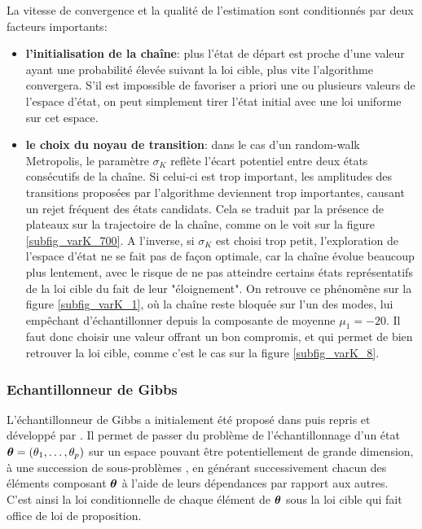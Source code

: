 La vitesse de convergence et la qualité de l'estimation sont conditionnés par deux facteurs importants: 
\begin{itemize}
	\item \textbf{l'initialisation de la chaîne}: plus l'état de départ est proche d'une valeur ayant une probabilité élevée suivant la loi cible, plus vite l'algorithme convergera. S'il est impossible de favoriser a priori une ou plusieurs valeurs de l'espace d'état, on peut simplement tirer l'état initial avec une loi uniforme sur cet espace.
	\item \textbf{le choix du noyau de transition}: dans le cas d'un random-walk Metropolis, le paramètre $\sigma_K$ reflète l'écart potentiel entre deux états consécutifs de la chaîne. Si celui-ci est trop important, les amplitudes des transitions proposées par l'algorithme deviennent trop importantes, causant un rejet fréquent des états candidats. Cela se traduit par la présence de plateaux sur la trajectoire de la chaîne, comme on le voit sur la figure \ref{subfig_varK_700}. A l'inverse, si $\sigma_K$ est choisi trop petit, l'exploration de l'espace d'état ne se fait pas de façon optimale, car la chaîne évolue beaucoup plus lentement, avec le risque de ne pas atteindre certains états représentatifs de la loi cible du fait de leur "éloignement". On retrouve ce phénomène sur la figure \ref{subfig_varK_1}, où la chaîne reste bloquée sur l'un des modes, lui empêchant d'échantillonner depuis la composante de moyenne $\mu_1 = -20$. Il faut donc choisir une valeur offrant un bon compromis, et qui permet de bien retrouver la loi cible, comme c'est le cas sur la figure \ref{subfig_varK_8}. 
\end{itemize}

\subsubsection{Echantillonneur de Gibbs}
L'échantillonneur de Gibbs a initialement été proposé dans \cite{Geman1984} puis repris et développé par \cite{Gelfand1990}. Il permet de passer du problème de l'échantillonnage d'un état ${\bm{\theta}} = (\theta_1, \dots, \theta_p)$ sur un espace pouvant être potentiellement de grande dimension, à une succession de sous-problèmes , en générant successivement chacun des éléments composant ${\bm{\theta}}$ à l'aide de leurs dépendances par rapport aux autres. C'est ainsi la loi conditionnelle de chaque élément de ${\bm{\theta}}$ sous la loi cible qui fait office de loi de proposition.

